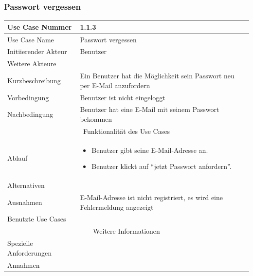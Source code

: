 \documentclass[10pt,a4paper]{article}
\begin{document}
\subsubsection{Passwort vergessen}
	\begin{tabularx}{\textwidth}{|l|X|}
	\hline Use Case Nummer & 1.1.3 \\ 
	\hline Use Case Name & Passwort vergessen \\ 
	\hline Initiierender Akteur & Benutzer \\
	\hline Weitere Akteure &  \\
	\hline Kurzbeschreibung & Ein Benutzer hat die M\"oglichkeit sein Passwort neu per E-Mail anzufordern \\
	\hline Vorbedingung & Benutzer ist nicht eingeloggt \\
	\hline Nachbedingung & Benutzer hat eine E-Mail mit seinem Passwort bekommen \\
	\hline \multicolumn{2}{|c|}{Funktionalität des Use Cases}\\
	\hline Ablauf & \begin{itemize}
		\item Benutzer gibt seine E-Mail-Adresse an.
		\item Benutzer klickt auf ``jetzt Passwort anfordern''.
	\end{itemize} \\
	\hline Alternativen &  \\
	\hline Ausnahmen & E-Mail-Adresse ist nicht registriert, es wird eine Fehlermeldung angezeigt \\
	\hline Benutzte Use Cases &  \\
	\hline \multicolumn{2}{|c|}{Weitere Informationen} \\
	\hline Spezielle Anforderungen &  \\
	\hline Annahmen &  \\
	\hline
\end{tabularx}
\end{document}
